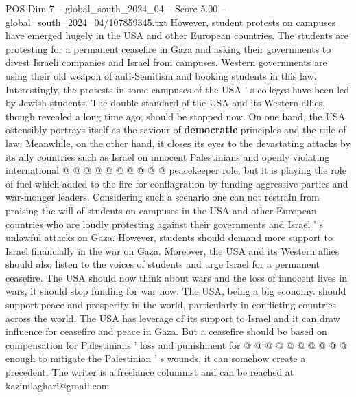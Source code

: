 \begin{textsample}{POS Dim 7 – global\_south\_2024\_04 – Score 5.00 – global\_south\_2024\_04/107859345.txt}
However, student protests on campuses have emerged hugely in the USA and other European countries.
The students are protesting for a permanent ceasefire in Gaza and asking their governments to divest Israeli companies and Israel from campuses.
Western governments are using their old weapon of anti-Semitism and booking students in this law.
Interestingly, the protests in some campuses of the USA ' s colleges have been led by Jewish students.
The double standard of the USA and its Western allies, though revealed a long time ago, should be stopped now.
On one hand, the USA ostensibly portrays itself as the saviour of \textbf{democratic} principles and the rule of law.
Meanwhile, on the other hand, it closes its eyes to the devastating attacks by its ally countries such as Israel on innocent Palestinians and openly violating international @ @ @ @ @ @ @ @ @ @ peacekeeper role, but it is playing the role of fuel which added to the fire for conflagration by funding aggressive parties and war-monger leaders.
Considering such a scenario one can not restrain from praising the will of students on campuses in the USA and other European countries who are loudly protesting against their governments and Israel ' s unlawful attacks on Gaza.
However, students should demand more support to Israel financially in the war on Gaza.
Moreover, the USA and its Western allies should also listen to the voices of students and urge Israel for a permanent ceasefire.
The USA should now think about wars and the loss of innocent lives in wars, it should stop funding for war now.
The USA, being a big economy. should support peace and prosperity in the world, particularly in conflicting countries across the world.
The USA has leverage of its support to Israel and it can draw influence for ceasefire and peace in Gaza.
But a ceasefire should be based on compensation for Palestinians ' loss and punishment for @ @ @ @ @ @ @ @ @ @ enough to mitigate the Palestinian ' s wounds, it can somehow create a precedent.
The writer is a freelance columnist and can be reached at kazimlaghari@gmail.com

\end{textsample}

